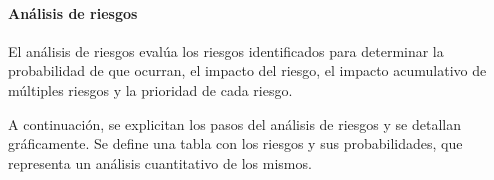 \paragraph{Análisis de riesgos}

El análisis de riesgos evalúa los riesgos identificados para determinar la probabilidad de que ocurran, el impacto del riesgo, el impacto acumulativo de múltiples riesgos y la prioridad de cada riesgo.

A continuación, se explicitan los pasos del análisis de riesgos y se detallan gráficamente.
Se define una tabla con los riesgos y sus probabilidades, que representa un análisis cuantitativo de los mismos.

